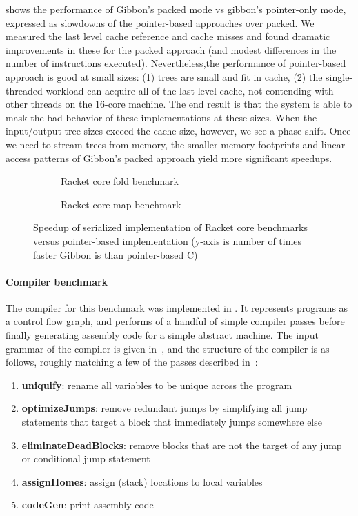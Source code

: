  shows the performance of Gibbon's packed mode vs gibbon's
pointer-only mode, expressed as slowdowns of the pointer-based approaches over
packed. We measured the last level cache reference and cache misses and found
dramatic improvements in these for the packed approach (and modest differences
in the number of instructions executed).
%
Nevertheless,the performance of pointer-based
approach is good at small sizes: (1) trees are small and fit in cache, (2) the
single-threaded workload can acquire all of the last level cache, not contending
with other threads on the 16-core machine. The end result is that the system is
able to mask the bad behavior of these implementations at these sizes.
%
When the input/output tree sizes exceed the cache size, however, we see a phase
shift. Once we need to stream trees from memory, the smaller memory footprints
and linear access patterns of Gibbon's packed approach yield more significant
speedups.

\begin{figure}
  \begin{subfigure}[t]{\linewidth}
    \centering
    
    \caption{Racket core fold benchmark}
  \end{subfigure}
  \begin{subfigure}[t]{\linewidth}
    \centering
    
    \caption{Racket core map benchmark}
  \end{subfigure}
  \caption{Speedup of serialized implementation of Racket core benchmarks versus
    pointer-based implementation (y-axis is number of times faster Gibbon is than
    pointer-based C)}\label{fig:racket-core-slowdown}
\end{figure}


\paragraph{Compiler benchmark}
The compiler for this benchmark was implemented in \lamadt{}. It represents
programs as a control flow graph, and performs of a handful of simple compiler
passes before finally generating assembly code for a simple abstract machine.
The input grammar of the compiler is given
in~, and the structure of the compiler is as
follows, roughly matching a few of the passes described
in~\cite{compilers-textbook}:
%
\begin{enumerate}
  \item \textbf{uniquify}: rename all variables to be unique across the program
  \item \textbf{optimizeJumps}: remove redundant jumps by simplifying all jump
        statements that target a block that immediately jumps somewhere else
  \item \textbf{eliminateDeadBlocks}: remove blocks that are not the target of
        any jump or conditional jump statement
  \item \textbf{assignHomes}: assign (stack) locations to local variables
  \item \textbf{codeGen}: print assembly code
\end{enumerate}

